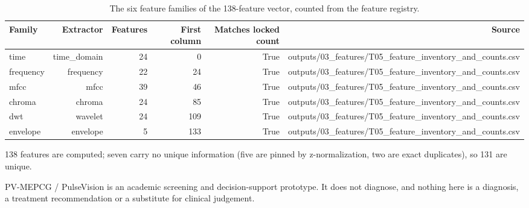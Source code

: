 \begin{table}[htbp]
  \centering
  \caption{The six feature families of the 138-feature vector, counted from the feature registry.}
  \label{tab:q1_t02}
  \begin{tabular}{lrrrrr}
    \toprule
    Family & Extractor & Features & First column & Matches locked count & Source \\
    \midrule
    time & time\_domain & 24 & 0 & True & outputs/03\_features/T05\_feature\_inventory\_and\_counts.csv \\
    frequency & frequency & 22 & 24 & True & outputs/03\_features/T05\_feature\_inventory\_and\_counts.csv \\
    mfcc & mfcc & 39 & 46 & True & outputs/03\_features/T05\_feature\_inventory\_and\_counts.csv \\
    chroma & chroma & 24 & 85 & True & outputs/03\_features/T05\_feature\_inventory\_and\_counts.csv \\
    dwt & wavelet & 24 & 109 & True & outputs/03\_features/T05\_feature\_inventory\_and\_counts.csv \\
    envelope & envelope & 5 & 133 & True & outputs/03\_features/T05\_feature\_inventory\_and\_counts.csv \\
    \bottomrule
  \end{tabular}
  \par\footnotesize 138 features are computed; seven carry no unique information (five are pinned by z-normalization, two are exact duplicates), so 131 are unique.
  \par\footnotesize PV-MEPCG / PulseVision is an academic screening and decision-support prototype. It does not diagnose, and nothing here is a diagnosis, a treatment recommendation or a substitute for clinical judgement.
\end{table}

